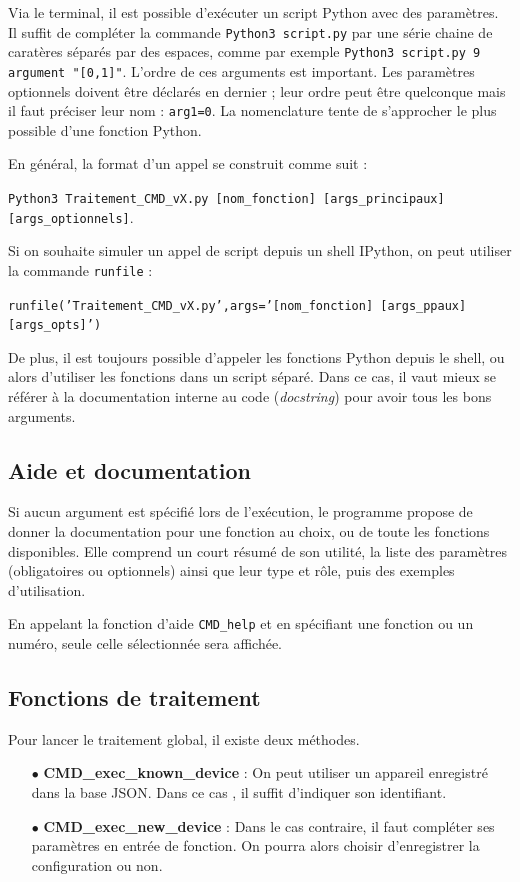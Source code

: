 \documentclass[12pt]{article}
\begin{document}
    Via le terminal, il est possible d'exécuter un script Python avec des paramètres. Il suffit de compléter la commande \texttt{Python3 script.py} par une série chaine de caratères séparés par des espaces, comme par exemple \texttt{Python3 script.py 9 argument "[0,1]"}. L'ordre de ces arguments est important. Les paramètres optionnels doivent être déclarés en dernier ; leur ordre peut être quelconque mais il faut préciser leur nom : \texttt{arg1=0}. La nomenclature tente de s'approcher le plus possible d'une fonction Python.

    En général, la format d'un appel se construit comme suit :
    
    \texttt{Python3 Traitement\_CMD\_vX.py [nom\_fonction] [args\_principaux] [args\_optionnels]}.

    Si on souhaite simuler un appel de script depuis un shell IPython, on peut utiliser la commande \texttt{runfile} :
    
    \texttt{runfile('Traitement\_CMD\_vX.py',args='[nom\_fonction] [args\_ppaux] [args\_opts]')}

    De plus, il est toujours possible d'appeler les fonctions Python depuis le shell, ou alors d'utiliser les fonctions dans un script séparé. Dans ce cas, il vaut mieux se référer à la documentation interne au code (\textit{docstring}) pour avoir tous les bons arguments.

\subsection{Aide et documentation}

    Si aucun argument est spécifié lors de l'exécution, le programme propose de donner la documentation pour une fonction au choix, ou de toute les fonctions disponibles. Elle comprend un court résumé de son utilité, la liste des paramètres (obligatoires ou optionnels) ainsi que leur type et rôle, puis des exemples d'utilisation.

    En appelant la fonction d'aide \texttt{CMD\_help} et en spécifiant une fonction ou un numéro, seule celle sélectionnée sera affichée.

\subsection{Fonctions de traitement}

    Pour lancer le traitement global, il existe deux méthodes.
    \begin{enumerate}
        \item[$\bullet$] \textbf{CMD\_exec\_known\_device} : On peut utiliser un appareil enregistré dans la base JSON. Dans ce cas , il suffit d'indiquer son identifiant.
        \item[$\bullet$] \textbf{CMD\_exec\_new\_device} : Dans le cas contraire, il faut compléter ses paramètres en entrée de fonction. On pourra alors choisir d'enregistrer la configuration ou non.
    \end{enumerate}
    
\end{document}
